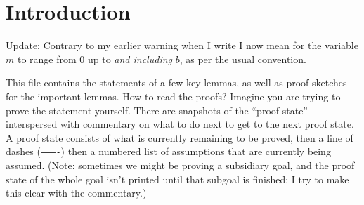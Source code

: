 \documentclass{article}
\begin{document}
\section*{Introduction}
Update: Contrary to my earlier warning when I write  I now mean for the variable $m$ to range from $0$ up to \emph{and including} $b$, as per the usual convention.

This file contains the statements of a few key lemmas, as well as proof sketches for the important lemmas.
How to read the proofs?
Imagine you are trying to prove the statement yourself.
There are snapshots of the ``proof state'' interspersed with commentary on what to do next to get to the next proof state.
A proof state consists of what is currently remaining to be proved, then a line of dashes (\texttt{----------}) then a numbered list of assumptions that are currently being assumed.
(Note: sometimes we might be proving a subsidiary goal, and the proof state of the whole goal isn't printed until that subgoal is finished; I try to make this clear with the commentary.)
\end{document}
